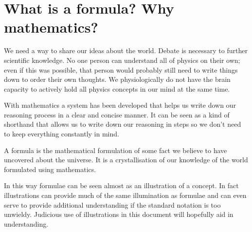 \documentclass{report}
\begin{document}
\section{What is a formula? Why mathematics?}
We need a way to share our ideas about the world. Debate is necessary to further scientific knowledge. No one person can understand all of physics on their own; even if this was possible, that person would probably still need to write things down to order their own thoughts. We physiologically do not have the brain capacity to actively hold all physics concepts in our mind at the same time.

With mathematics a system has been developed that helps us write down our reasoning process in a clear and concise manner. It can be seen as a kind of shorthand that allows us to write down our reasoning in steps so we don't need to keep everything constantly in mind.

A formula is the mathematical formulation of some fact we believe to have uncovered about the universe. It is a crystallisation of our knowledge of the world formulated using mathematics.

In this way formulae can be seen almost as an illustration of a concept. In fact illustrations can provide much of the same illumination as formulae and can even serve to provide additional understanding if the standard notation is too unwieldy. Judicious use of illustrations in this document will hopefully aid in understanding.
\end{document}
